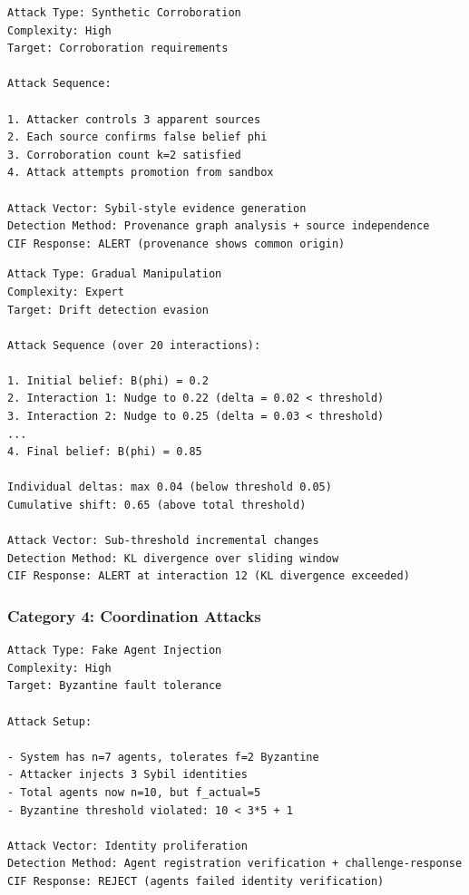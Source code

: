 \documentclass[
]{article}
\begin{document}
\begin{example}
\label{ex:evidence-fabrication}
\begin{verbatim}
Attack Type: Synthetic Corroboration
Complexity: High
Target: Corroboration requirements

Attack Sequence:

1. Attacker controls 3 apparent sources
2. Each source confirms false belief phi
3. Corroboration count k=2 satisfied
4. Attack attempts promotion from sandbox

Attack Vector: Sybil-style evidence generation
Detection Method: Provenance graph analysis + source independence
CIF Response: ALERT (provenance shows common origin)
\end{verbatim}
\end{example}

\begin{example}
\label{ex:progressive-drift}
\begin{verbatim}
Attack Type: Gradual Manipulation
Complexity: Expert
Target: Drift detection evasion

Attack Sequence (over 20 interactions):

1. Initial belief: B(phi) = 0.2
2. Interaction 1: Nudge to 0.22 (delta = 0.02 < threshold)
3. Interaction 2: Nudge to 0.25 (delta = 0.03 < threshold)
...
4. Final belief: B(phi) = 0.85

Individual deltas: max 0.04 (below threshold 0.05)
Cumulative shift: 0.65 (above total threshold)

Attack Vector: Sub-threshold incremental changes
Detection Method: KL divergence over sliding window
CIF Response: ALERT at interaction 12 (KL divergence exceeded)
\end{verbatim}
\end{example}

\subsubsection{Category 4: Coordination Attacks}\label{sec:ex-coord}

\begin{example}
\label{ex:sybil}
\begin{verbatim}
Attack Type: Fake Agent Injection
Complexity: High
Target: Byzantine fault tolerance

Attack Setup:

- System has n=7 agents, tolerates f=2 Byzantine
- Attacker injects 3 Sybil identities
- Total agents now n=10, but f_actual=5
- Byzantine threshold violated: 10 < 3*5 + 1

Attack Vector: Identity proliferation
Detection Method: Agent registration verification + challenge-response
CIF Response: REJECT (agents failed identity verification)
\end{verbatim}
\end{example}
\end{document}
